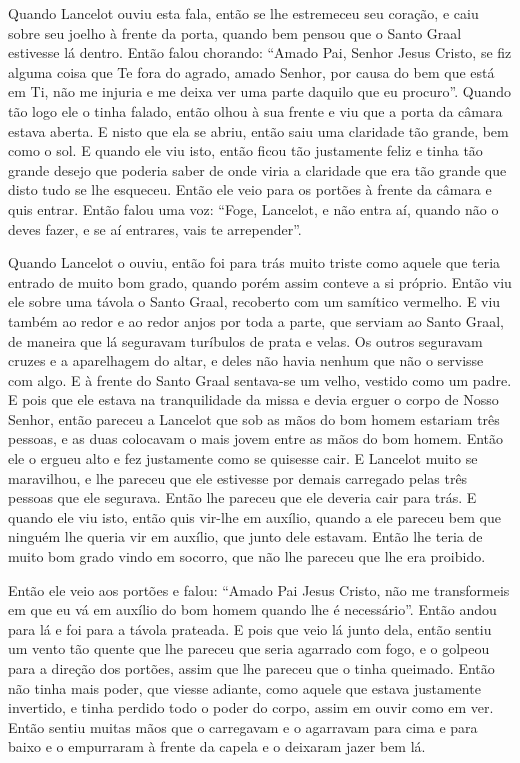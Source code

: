  Quando Lancelot ouviu esta fala, então se lhe estremeceu seu coração, e caiu
sobre seu joelho à frente da porta, quando bem pensou que o Santo Graal
estivesse lá dentro. Então falou chorando: “Amado Pai, Senhor Jesus Cristo, se
fiz alguma coisa que Te fora do agrado, amado Senhor, por causa do bem que está
em Ti, não me injuria e me deixa ver uma parte daquilo que eu procuro”. Quando
tão logo ele o tinha falado, então olhou à sua frente e viu que a porta da
câmara estava aberta. E nisto que ela se abriu, então saiu uma claridade tão
grande, bem como o sol. E quando ele viu isto, então ficou tão justamente feliz
e tinha tão grande desejo que poderia saber de onde viria a claridade que era
tão grande que disto tudo se lhe esqueceu. Então ele veio para os portões à
frente da câmara e quis entrar. Então falou uma voz: “Foge, Lancelot, e não
entra aí, quando não o deves fazer, e se aí entrares, vais te arrepender”. 

Quando Lancelot o ouviu, então foi para trás muito triste como aquele que teria
entrado de muito bom grado, quando porém assim conteve a si próprio. Então viu
ele sobre uma távola o Santo Graal, recoberto com um samítico vermelho. E viu
também ao redor e ao redor anjos por toda a parte, que serviam ao Santo Graal,
de maneira que lá seguravam turíbulos de prata e velas. Os outros seguravam
cruzes e a aparelhagem do altar, e deles não havia nenhum que não o servisse
com algo. E à frente do Santo Graal sentava-se um velho, vestido como um padre.
E pois que ele estava na tranquilidade da missa e devia erguer o corpo de Nosso
Senhor, então pareceu a Lancelot que sob as mãos do bom homem estariam três
pessoas, e as duas colocavam o mais jovem entre as mãos do bom homem. Então ele
o ergueu alto e fez justamente como se quisesse cair. E Lancelot muito se
maravilhou, e lhe pareceu que ele estivesse por demais carregado pelas três
pessoas que ele segurava. Então lhe pareceu que ele deveria cair para trás. E
quando ele viu isto, então quis vir-lhe em auxílio, quando a ele pareceu bem
que ninguém lhe queria vir em auxílio, que junto dele estavam. Então lhe teria
de muito bom grado vindo em socorro, que não lhe pareceu que lhe era proibido. 

Então ele veio aos portões e falou: “Amado Pai Jesus Cristo, não me transformeis
em que eu vá em auxílio do bom homem quando lhe é necessário”. Então andou para
lá e foi para a távola prateada. E pois que veio lá junto dela, então sentiu um
vento tão quente que lhe pareceu que seria agarrado com fogo, e o golpeou para
a direção dos portões, assim que lhe pareceu que o tinha queimado. Então não 
tinha mais poder, que viesse adiante, como aquele que estava
justamente invertido, e tinha perdido todo o poder do corpo, assim em ouvir
como em ver. Então sentiu muitas mãos que o carregavam e o agarravam para cima
e para baixo e o empurraram à frente da capela e o deixaram jazer bem lá. 

